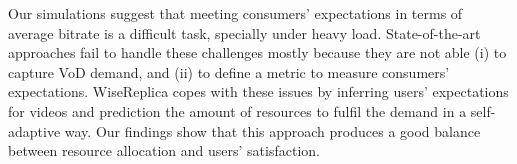 Our simulations suggest that meeting consumers' expectations in terms of average bitrate is a difficult task, specially under heavy load. State-of-the-art approaches fail to handle these challenges mostly because they are not able (i) to capture VoD demand, and (ii) to define a metric to measure consumers' expectations. WiseReplica copes with these issues by inferring users' expectations for videos and prediction the amount of resources to fulfil the demand in a self-adaptive way. Our findings show that this approach produces a good balance between resource allocation and users' satisfaction.

